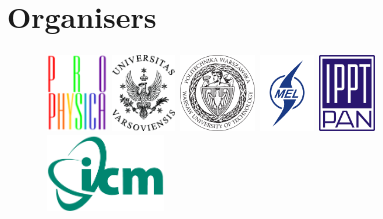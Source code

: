 
\section*{Organisers}
\begin{figure}[H]%
\centering
	\includegraphics[height=2cm,keepaspectratio]{logo_organiz/prophys165x131px.pdf} \hfill
	\includegraphics[height=2cm,keepaspectratio]{logo_organiz/Logotyp_UW_lacina} \hfill
	\includegraphics[height=2cm,keepaspectratio]{logo_organiz/logo_Politechniki_Warszawskiej__NEW_POZYTYW_pol.pdf} \hfill
	\includegraphics[height=2cm,keepaspectratio]{logo_organiz/logo_meil.png} \hfill
	\includegraphics[height=2cm,keepaspectratio]{logo_organiz/oficjalne-logo-IPPT1200x1600} \hfill
	\includegraphics[height=2cm,keepaspectratio]{logo_organiz/logoICM} \hfill
\end{figure}


